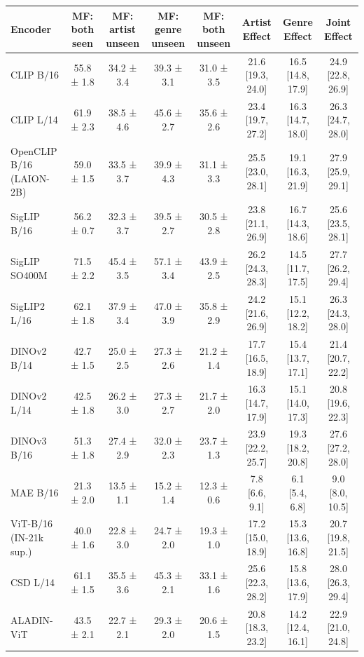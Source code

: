 \begin{tabular}{lccccccc}
\toprule
Encoder & MF: both seen & MF: artist unseen & MF: genre unseen & MF: both unseen & Artist Effect & Genre Effect & Joint Effect \\
\midrule
CLIP B/16 & 55.8 ± 1.8 & 34.2 ± 3.4 & 39.3 ± 3.1 & 31.0 ± 3.5 & 21.6 [19.3, 24.0] & 16.5 [14.8, 17.9] & 24.9 [22.8, 26.9] \\
CLIP L/14 & 61.9 ± 2.3 & 38.5 ± 4.6 & 45.6 ± 2.7 & 35.6 ± 2.6 & 23.4 [19.7, 27.2] & 16.3 [14.7, 18.0] & 26.3 [24.7, 28.0] \\
OpenCLIP B/16 (LAION-2B) & 59.0 ± 1.5 & 33.5 ± 3.7 & 39.9 ± 4.3 & 31.1 ± 3.3 & 25.5 [23.0, 28.1] & 19.1 [16.3, 21.9] & 27.9 [25.9, 29.1] \\
SigLIP B/16 & 56.2 ± 0.7 & 32.3 ± 3.7 & 39.5 ± 2.7 & 30.5 ± 2.8 & 23.8 [21.1, 26.9] & 16.7 [14.3, 18.6] & 25.6 [23.5, 28.1] \\
SigLIP SO400M & 71.5 ± 2.2 & 45.4 ± 3.5 & 57.1 ± 3.4 & 43.9 ± 2.5 & 26.2 [24.3, 28.3] & 14.5 [11.7, 17.5] & 27.7 [26.2, 29.4] \\
SigLIP2 L/16 & 62.1 ± 1.8 & 37.9 ± 3.4 & 47.0 ± 3.9 & 35.8 ± 2.9 & 24.2 [21.6, 26.9] & 15.1 [12.2, 18.2] & 26.3 [24.3, 28.0] \\
DINOv2 B/14 & 42.7 ± 1.5 & 25.0 ± 2.5 & 27.3 ± 2.6 & 21.2 ± 1.4 & 17.7 [16.5, 18.9] & 15.4 [13.7, 17.1] & 21.4 [20.7, 22.2] \\
DINOv2 L/14 & 42.5 ± 1.8 & 26.2 ± 3.0 & 27.3 ± 2.7 & 21.7 ± 2.0 & 16.3 [14.7, 17.9] & 15.1 [14.0, 17.3] & 20.8 [19.6, 22.3] \\
DINOv3 B/16 & 51.3 ± 1.8 & 27.4 ± 2.9 & 32.0 ± 2.3 & 23.7 ± 1.3 & 23.9 [22.2, 25.7] & 19.3 [18.2, 20.8] & 27.6 [27.2, 28.0] \\
MAE B/16 & 21.3 ± 2.0 & 13.5 ± 1.1 & 15.2 ± 1.4 & 12.3 ± 0.6 & 7.8 [6.6, 9.1] & 6.1 [5.4, 6.8] & 9.0 [8.0, 10.5] \\
ViT-B/16 (IN-21k sup.) & 40.0 ± 1.6 & 22.8 ± 3.0 & 24.7 ± 2.0 & 19.3 ± 1.0 & 17.2 [15.0, 18.9] & 15.3 [13.6, 16.8] & 20.7 [19.8, 21.5] \\
CSD L/14 & 61.1 ± 1.5 & 35.5 ± 3.6 & 45.3 ± 2.1 & 33.1 ± 1.6 & 25.6 [22.3, 28.2] & 15.8 [13.6, 17.9] & 28.0 [26.3, 29.4] \\
ALADIN-ViT & 43.5 ± 2.1 & 22.7 ± 2.1 & 29.3 ± 2.0 & 20.6 ± 1.5 & 20.8 [18.3, 23.2] & 14.2 [12.4, 16.1] & 22.9 [21.0, 24.8] \\
\bottomrule
\end{tabular}
